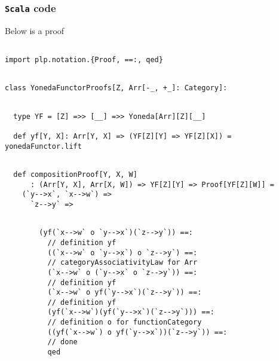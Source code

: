 \documentclass[11pt]{article}
\newcommand{\code}{\subsubsection{{\tt Scala} code}\begingroup\rm \vspace{12pt}}
\begin{document}
\code
Below is a proof

\vspace{6pt}
\begin{mdframed}[backgroundcolor=lightgray!20] 
\begin{lstlisting}

import plp.notation.{Proof, ==:, qed}
\end{lstlisting}
\end{mdframed}
\vspace{6pt}
\begin{mdframed}[backgroundcolor=lightgray!20] 
\begin{lstlisting}

class YonedaFunctorProofs[Z, Arr[-_, +_]: Category]:
\end{lstlisting}
\end{mdframed}
\vspace{6pt}
\begin{mdframed}[backgroundcolor=lightgray!20] 
\begin{lstlisting}

  type YF = [Z] =>> [__] =>> Yoneda[Arr][Z][__]

  def yf[Y, X]: Arr[Y, X] => (YF[Z][Y] => YF[Z][X]) = yonedaFunctor.lift
\end{lstlisting}
\end{mdframed}
\vspace{6pt}
\begin{mdframed}[backgroundcolor=lightgray!20] 
\begin{lstlisting}

  def compositionProof[Y, X, W]
      : (Arr[Y, X], Arr[X, W]) => YF[Z][Y] => Proof[YF[Z][W]] =
    (`y-->x`, `x-->w`) =>
      `z-->y` => 
\end{lstlisting}
\end{mdframed}
\vspace{6pt}
\begin{mdframed}[backgroundcolor=lightgray!20] 
\begin{lstlisting}
        
        (yf(`x-->w` o `y-->x`)(`z-->y`)) ==:
          // definition yf
          ((`x-->w` o `y-->x`) o `z-->y`) ==:
          // categoryAssociativityLaw for Arr
          (`x-->w` o (`y-->x` o `z-->y`)) ==:
          // definition yf
          (`x-->w` o yf(`y-->x`)(`z-->y`)) ==:
          // definition yf
          (yf(`x-->w`)(yf(`y-->x`)(`z-->y`))) ==:
          // definition o for functionCategory
          ((yf(`x-->w`) o yf(`y-->x`))(`z-->y`)) ==:
          // done
          qed
\end{lstlisting}
\end{mdframed}
\end{document}
